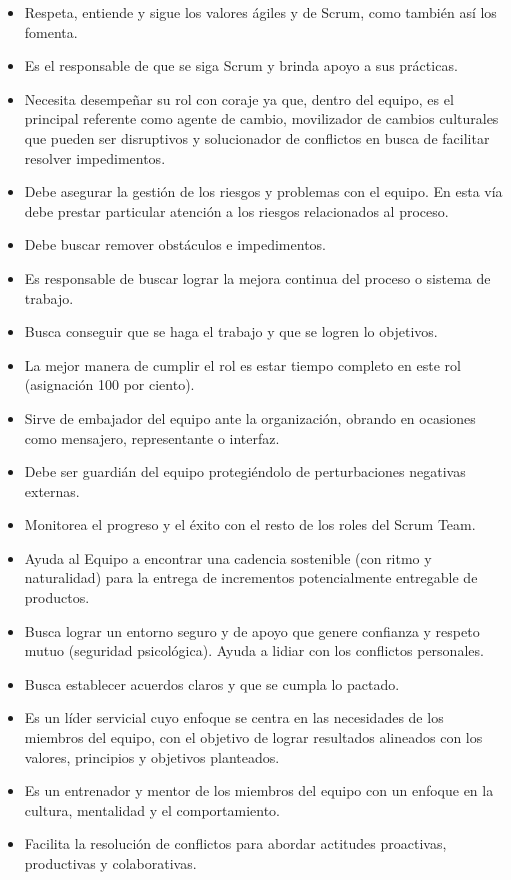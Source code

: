 \begin{itemize}
\item Respeta, entiende y sigue los valores ágiles y de Scrum, como también así los fomenta.
\item Es el responsable de que se siga Scrum y brinda apoyo a sus prácticas.
\item Necesita desempeñar su rol con coraje ya que, dentro del equipo, es el principal referente como agente de cambio, movilizador de cambios culturales que pueden ser disruptivos y solucionador de conflictos en busca de facilitar resolver impedimentos.
\item Debe asegurar la gestión de los riesgos y problemas con el equipo. En esta vía debe prestar particular atención a los riesgos relacionados al proceso.
\item Debe buscar remover obstáculos e impedimentos.
\item Es responsable de buscar lograr la mejora continua del proceso o sistema de trabajo.
\item Busca conseguir que se haga el trabajo y que se logren lo objetivos.
\item La mejor manera de cumplir el rol es estar tiempo completo en este rol (asignación 100 por ciento).
\item Sirve de embajador del equipo ante la organización, obrando en ocasiones como mensajero, representante o interfaz.
\item Debe ser guardián del equipo protegiéndolo de perturbaciones negativas externas.
\item Monitorea el progreso y el éxito con el resto de los roles del Scrum Team.
\item Ayuda al Equipo a encontrar una cadencia sostenible (con ritmo y naturalidad) para la entrega de incrementos potencialmente entregable de productos. 
\item Busca lograr un entorno seguro y de apoyo que genere confianza y respeto mutuo (seguridad psicológica). Ayuda a lidiar con los conflictos personales.
\item Busca establecer acuerdos claros y que se cumpla lo pactado.
\item Es un líder servicial cuyo enfoque se centra en las necesidades de los miembros del equipo, con el objetivo de lograr resultados alineados con los valores, principios y objetivos planteados.
\item Es un entrenador y mentor de los miembros del equipo con un enfoque en la cultura, mentalidad y el comportamiento.
\item Facilita la resolución de conflictos para abordar actitudes proactivas, productivas y colaborativas.

\end{itemize}
